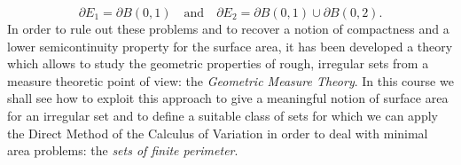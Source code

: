 \begin{equation*}
\partial E_{1} = \partial B(0, 1) \quad \text{and} \quad \partial E_{2} = \partial B(0, 1) \cup \partial B(0, 2).
\end{equation*} 
In order to rule out these problems and to recover a notion of compactness and a lower semicontinuity property for the surface area, it has been developed a theory which allows to study the geometric properties of rough, irregular sets from a measure theoretic point of view: the {\em Geometric Measure Theory}. In this course we shall see how to exploit this approach to give a meaningful notion of surface area for an irregular set and to define a suitable class of sets for which we can apply the Direct Method of the Calculus of Variation in order to deal with minimal area problems: the {\em sets of finite perimeter}. 


